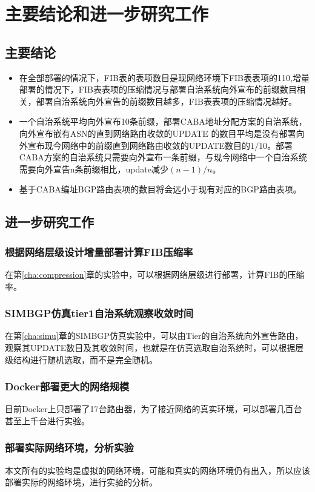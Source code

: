 ﻿

\chapter{主要结论和进一步研究工作}
\section{主要结论}
\begin{itemize}
\item 在全部部署的情况下，FIB表的表项数目是现网络环境下FIB表表项的1\/10,增量部署的情况下，FIB表表项的压缩情况与部署自治系统向外宣布的前缀数目相关，部署自治系统向外宣告的前缀数目越多，FIB表表项的压缩情况越好。
\item 一个自治系统平均向外宣布10条前缀，部署CABA地址分配方案的自治系统，向外宣布嵌有ASN的直到网络路由收敛的UPDATE 的数目平均是没有部署向外宣布现今网络中的前缀直到网络路由收敛的UPDATE数目的$1/10$。部署CABA方案的自治系统只需要向外宣布一条前缀，与现今网络中一个自治系统需要向外宣告n条前缀相比，update减少$(n-1)/n$。
\item 基于CABA编址BGP路由表项的数目将会远小于现有对应的BGP路由表项。
\end{itemize}
\section{进一步研究工作}
\subsection{根据网络层级设计增量部署计算FIB压缩率}
在第\ref{cha:compression}章的实验中，可以根据网络层级进行部署，计算FIB的压缩率。
\subsection{SIMBGP仿真tier1自治系统观察收敛时间}
在第\ref{cha:simu}章的SIMBGP仿真实验中，可以由Tier的自治系统向外宣告路由，观察其UPDATE数目及其收敛时间，也就是在仿真选取自治系统时，可以根据层级结构进行随机选取，而不是完全随机。
\subsection{Docker部署更大的网络规模}
目前Docker上只部署了17台路由器，为了接近网络的真实环境，可以部署几百台甚至上千台进行实验。
\subsection{部署实际网络环境，分析实验}
本文所有的实验均是虚拟的网络环境，可能和真实的网络环境仍有出入，所以应该部署实际的网络环境，进行实验的分析。
